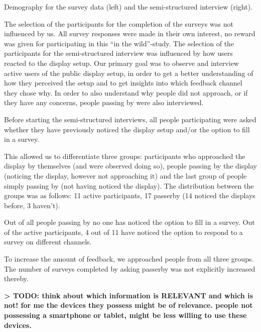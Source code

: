 		\begin{table}[h]

			

			\caption[Demographics of Field Study]{Demography for the survey data (left) and the semi-structured interview (right).}
			\label{table:demographics}
		\end{table}


		The selection of the participants for the completion of the surveys was not influenced by us. All survey responses were made in their own interest, no reward was given for participating in this ``in the wild''-study.
		The selection of the participants for the semi-structured interview was influenced by how users reacted to the display setup. Our primary goal was to observe and interview active users of the public display setup, in order to get a better understanding of how they perceived the setup and to get insights into which feedback channel they chose why. In order to also understand why people did not approach, or if they have any concerns, people passing by were also interviewed. 

		
		Before starting the semi-structured interviews, all people participating were asked whether they have previously noticed the display setup and/or the option to fill in a survey. 

		This allowed us to differentiate three groups: participants who approached the display by themselves (and were observed doing so), people passing by the display (noticing the display, however not approaching it) and the last group of people simply passing by (not having noticed the display). The distribution between the groups was as follows: 11 active participants, 17 passerby (14 noticed the displays before, 3 haven't). 

		Out of all people passing by no one has noticed the option to fill in a survey. Out of the active participants, 4 out of 11 have noticed the option to respond to a survey on different channels.

		To increase the amount of feedback, we approached people from all three groups. The number of surveys completed by asking passerby was not explicitly increased thereby.


		\textbf{> TODO: think about which information is RELEVANT and which is not! for me the devices they possess might be of relevance. people not possessing a smartphone or tablet, might be less willing to use these devices.} 
		

